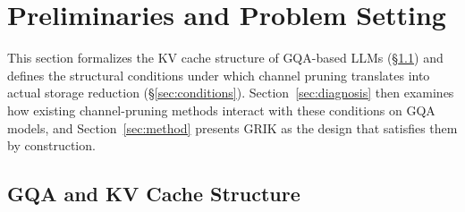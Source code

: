 \documentclass{article}
\begin{document}
 


\section{Preliminaries and Problem Setting}
\label{sec:preliminaries}
 
This section formalizes the KV cache structure of GQA-based LLMs (\S\ref{sec:gqa}) and defines the structural conditions under which channel pruning translates into actual storage reduction (\S\ref{sec:conditions}). Section~\ref{sec:diagnosis} then examines how existing channel-pruning methods interact with these conditions on GQA models, and Section~\ref{sec:method} presents GRIK as the design that satisfies them by construction.
 
\subsection{GQA and KV Cache Structure}
\label{sec:gqa}
 
\end{document}
